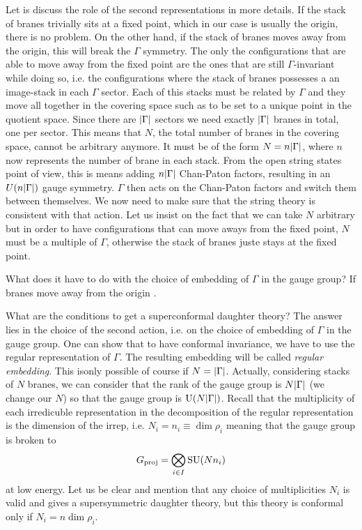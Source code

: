     Let is discuss the role of the second representations in more details. If the stack of branes trivially sits at a fixed point, which in our case is usually the origin, there is no problem. On the other hand, if the stack of branes moves away from the origin, this will break the $\Gamma$ symmetry. The only the configurations that are able to move away from the fixed point are the ones that are still $\Gamma$-invariant while doing so, i.e. the configurations where the stack of branes possesses a an image-stack in each $\Gamma$ sector. Each of this stacks must be related by $\Gamma$ and they move all together in the covering space such as to be set to a unique point in the quotient space. Since there are $\abs{\Gamma}$ sectors we need exactly $\abs{\Gamma}$ branes in total, one per sector. This means that $N$, the total number of branes in the covering space, cannot be arbitrary anymore. It must be of the form $N=n\abs{\Gamma}$, where $n$ now represents the number of brane in each stack. From the open string states point of view, this is means adding $n\abs{\Gamma}$ Chan-Paton factors, resulting in an $U(n\abs{\Gamma})$ gauge symmetry. $\Gamma$ then acts on the Chan-Paton factors and switch them between themselves. We now need to make sure that the string theory is consistent with that action. Let us insist on the fact that we can take $N$ arbitrary but in order to have configurations that can move aways from the fixed point, $N$ must be a multiple of $\Gamma$, otherwise the stack of branes juste stays at the fixed point.

    What does it have to do with the choice of embedding of $\Gamma$ in the gauge group? If branes move away from the origin .
    
    What are the conditions to get a superconformal daughter theory? The answer lies in the choice of the second action, i.e. on the choice of embedding of $\Gamma$ in the gauge group. One can show \cite{vafa1998} that to have conformal invariance, we have to use the regular representation of $\Gamma$. The resulting embedding will be called \emph{regular embedding}. This isonly possible of course if $N=\abs{\Gamma}$. Actually, considering stacks of $N$ branes, we can consider that the rank of the gauge group is $N\abs{\Gamma}$ (we change our $N$) so that the gauge group is $\text{U}(N\abs{\Gamma})$. Recall that the multiplicity of each irredicuble representation in the decomposition of the regular representation is the dimension of the irrep, i.e. $N_i=n_i\equiv\dim\rho_i$ meaning that the gauge group is broken to
    \begin{equation}
        G_{\text{proj}}=\bigotimes_{i\in I}\text{SU}(N n_i)
    \end{equation}
    at low energy. Let us be clear and mention that any choice of multiplicities $N_i$ is valid and gives a supersymmetric daughter theory, but this theory is conformal only if $N_i=n\dim\rho_i$.


